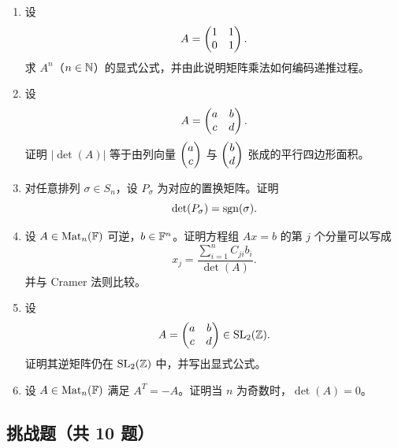 \begin{enumerate}[label=\arabic*.,start=31]
  \item \medium 设
  \[
  A=\begin{pmatrix} 1&1\\0&1 \end{pmatrix}.
  \]
  求 $A^n$（$n\in\mathbb{N}$）的显式公式，并由此说明矩阵乘法如何编码递推过程。

  \item \medium 设
  \[
  A=\begin{pmatrix} a&b\\c&d \end{pmatrix}.
  \]
  证明 $|\det(A)|$ 等于由列向量 $\begin{pmatrix} a\\c \end{pmatrix}$ 与 $\begin{pmatrix} b\\d \end{pmatrix}$ 张成的平行四边形面积。

  \item \medium 对任意排列 $\sigma\in S_n$，设 $P_\sigma$ 为对应的置换矩阵。证明
  \[
  \det(P_\sigma)=\operatorname{sgn}(\sigma).
  \]

  \item \medium 设 $A\in\mathrm{Mat}_n(\mathbb{F})$ 可逆，$b\in\mathbb{F}^n$。证明方程组 $Ax=b$ 的第 $j$ 个分量可以写成
  \[
  x_j=\frac{\sum_{i=1}^n C_{ji}b_i}{\det(A)}.
  \]
  并与 Cramer 法则比较。

  \item \medium 设
  \[
  A=\begin{pmatrix} a&b\\c&d \end{pmatrix}\in \mathrm{SL}_2(\mathbb{Z}).
  \]
  证明其逆矩阵仍在 $\mathrm{SL}_2(\mathbb{Z})$ 中，并写出显式公式。

  \item \medium 设 $A\in\mathrm{Mat}_n(\mathbb{F})$ 满足 $A^T=-A$。证明当 $n$ 为奇数时，$\det(A)=0$。
\end{enumerate}

\subsection*{挑战题（共 10 题）}

